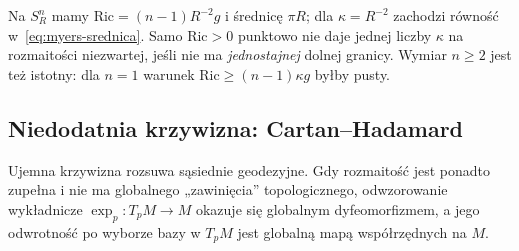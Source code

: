 \begin{przyklad}
Na $S_R^n$ mamy
$\mathrm{Ric}=(n-1)R^{-2}g$ i średnicę
$\pi R$; dla $\kappa=R^{-2}$ zachodzi
równość w~\eqref{eq:myers-srednica}.
Samo $\mathrm{Ric}>0$ punktowo nie daje
jednej liczby $\kappa$ na rozmaitości
niezwartej, jeśli nie ma \emph{jednostajnej}
dolnej granicy. Wymiar $n\geq2$ jest też
istotny: dla $n=1$ warunek
$\mathrm{Ric}\geq(n-1)\kappa g$ byłby pusty.
\end{przyklad}

\subsection*{Niedodatnia krzywizna: Cartan--Hadamard}

Ujemna krzywizna rozsuwa sąsiednie geodezyjne.
Gdy rozmaitość jest ponadto zupełna i nie ma
globalnego „zawinięcia” topologicznego,
odwzorowanie wykładnicze $\exp_p:T_pM\to M$ okazuje się
globalnym dyfeomorfizmem, a jego odwrotność po wyborze
bazy w $T_pM$ jest globalną mapą współrzędnych na $M$.

